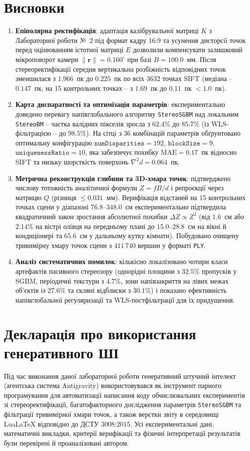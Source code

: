 \documentclass[14pt, a4paper]{extarticle}
\begin{document}
\section{Висновки}
\begin{enumerate}
    \item \textbf{Епіполярна ректифікація}: адаптація калібрувальної матриці $K$ з Лабораторної роботи №~2 під формат кадру 16:9 та усунення дисторсії точок перед оцінюванням істотної матриці $E$ дозволили компенсувати залишковий мікроповорот камери $\|\mathbf{r}\| = 0.160^\circ$ при базі $B = 100.0$~мм. Після стереоректифікації середня вертикальна розбіжність відповідних точок зменшилася з $1.966$~пк до $\mathbf{0.225}$~пк по всіх $3632$ точках SIFT (медіана -- $\mathbf{0.147}$~пк, на 15 контрольних точках -- з $1.69$~пк до $\mathbf{0.11}$~пк $< 1.0$~пк).
    \item \textbf{Карта диспаратності та оптимізація параметрів}: експериментально доведено перевагу напівглобального алгоритму \texttt{StereoSGBM} над локальним \texttt{StereoBM} -- частка валідних пікселів зросла з $62.4\%$ до $\mathbf{85.7\%}$ (із WLS-фільтрацією -- до $98.5\%$). На сітці з 36 комбінацій параметрів обґрунтовано оптимальну конфігурацію $\texttt{numDisparities} = 192$, $\texttt{blockSize} = 9$, $\texttt{uniquenessRatio} = 10$, яка забезпечує похибку $\text{MAE} = 0.17$~пк відносно SIFT та низьку шорсткість поверхонь $\nabla^2 d = 0.064$~пк.
    \item \textbf{Метрична реконструкція глибини та 3D-хмара точок}: підтверджено числову тотожність аналітичної формули $Z = fB/d$ і репроєкції через матрицю $Q$ (різниця $\le 0.031$~мм). Верифікація відстаней на 15 контрольних точках сцени у діапазоні $76.8$--$348.0$~см експериментально підтвердила квадратичний закон зростання абсолютної похибки $\Delta Z \propto Z^2$ (від $1.6$~см або $2.14\%$ на вістрі олівця на передньому плані до $15.0$--$28.8$~см на вікні й кондиціонері та $65.6$~см у дальньому кутку кімнати). Побудовано очищену тривимірну хмару точок сцени з $411\,740$ вершин у форматі \texttt{PLY}.
    \item \textbf{Аналіз систематичних помилок}: кількісно локалізовано чотири класи артефактів пасивного стереозору (однорідні площини з $32.5\%$ пропусків у SGBM, періодичні текстури з $4.7\%$, зони напівзакриття на лівих межах об'єктів із $27.6\%$ та скляні відблиски з $30.1\%$) і показано ефективність напівглобальної регуляризації та WLS-постфільтрації для їх придушення.
\end{enumerate}

\section{Декларація про використання генеративного ШІ}
Під час виконання даної лабораторної роботи генеративний штучний інтелект (агентська система Antigravity) використовувався як інструмент парного програмування для автоматизації написання коду обчислювальних експериментів зі стереоректифікації, багатофакторного дослідження параметрів \texttt{StereoSGBM} та фільтрації тривимірної хмари точок, а також верстки звіту в середовищі LuaLaTeX відповідно до ДСТУ 3008:2015. Усі експериментальні дані, математичні викладки, критерії верифікації та фізичні інтерпретації результатів були перевірені й проаналізовані автором.
\end{document}
